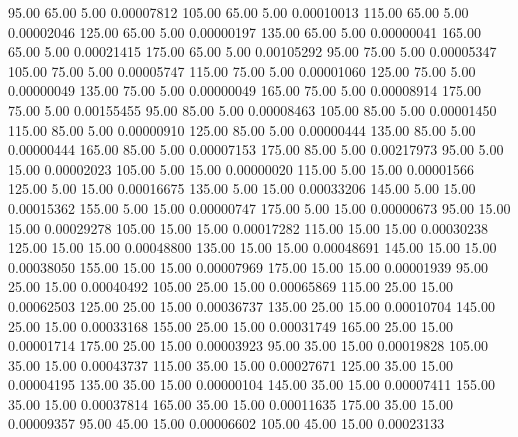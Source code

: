      95.00     65.00      5.00     0.00007812
    105.00     65.00      5.00     0.00010013
    115.00     65.00      5.00     0.00002046
    125.00     65.00      5.00     0.00000197
    135.00     65.00      5.00     0.00000041
    165.00     65.00      5.00     0.00021415
    175.00     65.00      5.00     0.00105292
     95.00     75.00      5.00     0.00005347
    105.00     75.00      5.00     0.00005747
    115.00     75.00      5.00     0.00001060
    125.00     75.00      5.00     0.00000049
    135.00     75.00      5.00     0.00000049
    165.00     75.00      5.00     0.00008914
    175.00     75.00      5.00     0.00155455
     95.00     85.00      5.00     0.00008463
    105.00     85.00      5.00     0.00001450
    115.00     85.00      5.00     0.00000910
    125.00     85.00      5.00     0.00000444
    135.00     85.00      5.00     0.00000444
    165.00     85.00      5.00     0.00007153
    175.00     85.00      5.00     0.00217973
     95.00      5.00     15.00     0.00002023
    105.00      5.00     15.00     0.00000020
    115.00      5.00     15.00     0.00001566
    125.00      5.00     15.00     0.00016675
    135.00      5.00     15.00     0.00033206
    145.00      5.00     15.00     0.00015362
    155.00      5.00     15.00     0.00000747
    175.00      5.00     15.00     0.00000673
     95.00     15.00     15.00     0.00029278
    105.00     15.00     15.00     0.00017282
    115.00     15.00     15.00     0.00030238
    125.00     15.00     15.00     0.00048800
    135.00     15.00     15.00     0.00048691
    145.00     15.00     15.00     0.00038050
    155.00     15.00     15.00     0.00007969
    175.00     15.00     15.00     0.00001939
     95.00     25.00     15.00     0.00040492
    105.00     25.00     15.00     0.00065869
    115.00     25.00     15.00     0.00062503
    125.00     25.00     15.00     0.00036737
    135.00     25.00     15.00     0.00010704
    145.00     25.00     15.00     0.00033168
    155.00     25.00     15.00     0.00031749
    165.00     25.00     15.00     0.00001714
    175.00     25.00     15.00     0.00003923
     95.00     35.00     15.00     0.00019828
    105.00     35.00     15.00     0.00043737
    115.00     35.00     15.00     0.00027671
    125.00     35.00     15.00     0.00004195
    135.00     35.00     15.00     0.00000104
    145.00     35.00     15.00     0.00007411
    155.00     35.00     15.00     0.00037814
    165.00     35.00     15.00     0.00011635
    175.00     35.00     15.00     0.00009357
     95.00     45.00     15.00     0.00006602
    105.00     45.00     15.00     0.00023133
